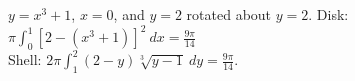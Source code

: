 {$y=x^3+1$, $x=0$, and $y=2$ rotated about $y=2$.}
{\noindent Disk: $\pi \int_0^1\left[2-(x^3+1)\right]^2\ dx=\frac{9\pi}{14}$\\
Shell: $2\pi \int_1^2 (2-y)\sqrt[3]{y-1}\ dy=\frac{9\pi}{14}$.}
